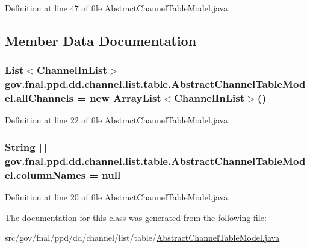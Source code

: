 Definition at line 47 of file Abstract\-Channel\-Table\-Model.\-java.



\subsection{Member Data Documentation}
\hypertarget{classgov_1_1fnal_1_1ppd_1_1dd_1_1channel_1_1list_1_1table_1_1AbstractChannelTableModel_a5fdecb28c6ee13eefbebf4588e1878d4}{
\subsubsection[{all\-Channels}]{\setlength{\rightskip}{0pt plus 5cm}List$<${\bf Channel\-In\-List}$>$ gov.\-fnal.\-ppd.\-dd.\-channel.\-list.\-table.\-Abstract\-Channel\-Table\-Model.\-all\-Channels = new Array\-List$<${\bf Channel\-In\-List}$>$()\hspace{0.3cm}{\ttfamily [protected]}}}\label{classgov_1_1fnal_1_1ppd_1_1dd_1_1channel_1_1list_1_1table_1_1AbstractChannelTableModel_a5fdecb28c6ee13eefbebf4588e1878d4}


Definition at line 22 of file Abstract\-Channel\-Table\-Model.\-java.

\hypertarget{classgov_1_1fnal_1_1ppd_1_1dd_1_1channel_1_1list_1_1table_1_1AbstractChannelTableModel_a04eb656b0de2250db759665a3edc56a6}{
\subsubsection[{column\-Names}]{\setlength{\rightskip}{0pt plus 5cm}String \mbox{[}$\,$\mbox{]} gov.\-fnal.\-ppd.\-dd.\-channel.\-list.\-table.\-Abstract\-Channel\-Table\-Model.\-column\-Names = null\hspace{0.3cm}{\ttfamily [protected]}}}\label{classgov_1_1fnal_1_1ppd_1_1dd_1_1channel_1_1list_1_1table_1_1AbstractChannelTableModel_a04eb656b0de2250db759665a3edc56a6}


Definition at line 20 of file Abstract\-Channel\-Table\-Model.\-java.



The documentation for this class was generated from the following file\-:\begin{DoxyCompactItemize}
\item 
src/gov/fnal/ppd/dd/channel/list/table/\hyperlink{AbstractChannelTableModel_8java}{Abstract\-Channel\-Table\-Model.\-java}\end{DoxyCompactItemize}
